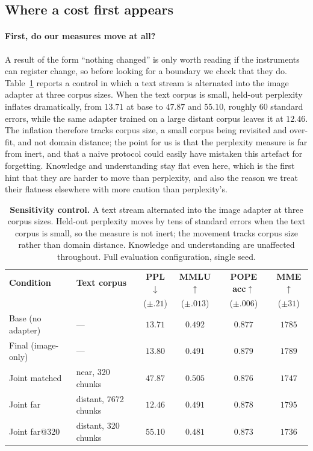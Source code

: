 \documentclass{article}
\begin{document}
\subsection{Where a cost first appears}
\label{sec:boundary}

\paragraph{First, do our measures move at all?}
A result of the form ``nothing changed'' is only worth reading if the
instruments can register change, so before looking for a boundary we check that
they do. Table~\ref{tab:joint} reports a control in which a text stream is
alternated into the image adapter at three corpus sizes. When the text corpus is
small, held-out perplexity inflates dramatically, from $13.71$ at base to
$47.87$ and $55.10$, roughly $60$ standard errors, while the same adapter trained
on a large distant corpus leaves it at $12.46$. The inflation therefore tracks
corpus size, a small corpus being revisited and over-fit, and not domain
distance; the point for us is that the perplexity measure is far from inert, and
that a naive protocol could easily have mistaken this artefact for forgetting.
Knowledge and understanding stay flat even here, which is the first hint that
they are harder to move than perplexity, and also the reason we treat their
flatness elsewhere with more caution than perplexity's.

\begin{table}[t]
\caption{\textbf{Sensitivity control.} A text stream alternated into the image
adapter at three corpus sizes. Held-out perplexity moves by tens of standard
errors when the text corpus is small, so the measure is not inert; the movement
tracks corpus size rather than domain distance. Knowledge and understanding are
unaffected throughout. Full evaluation configuration, single seed.}
\label{tab:joint}
\centering\small
\setlength{\tabcolsep}{6pt}
\begin{tabular}{llcccc}
\toprule
\textbf{Condition} & \textbf{Text corpus} & \textbf{PPL}$\downarrow$ & \textbf{MMLU}$\uparrow$ & \textbf{POPE acc}$\uparrow$ & \textbf{MME}$\uparrow$ \\
 & & \tiny($\pm.21$) & \tiny($\pm.013$) & \tiny($\pm.006$) & \tiny($\pm31$) \\
\midrule
Base (no adapter) & ---                  & $13.71$ & $0.492$ & $0.877$ & $1785$ \\
Final (image-only)& ---                  & $13.80$ & $0.491$ & $0.879$ & $1789$ \\
Joint matched     & near, 320 chunks     & $47.87$ & $0.505$ & $0.876$ & $1747$ \\
Joint far         & distant, 7672 chunks & $12.46$ & $0.491$ & $0.878$ & $1795$ \\
Joint far@320     & distant, 320 chunks  & $55.10$ & $0.481$ & $0.873$ & $1736$ \\
\bottomrule
\end{tabular}
\end{table}
\end{document}
